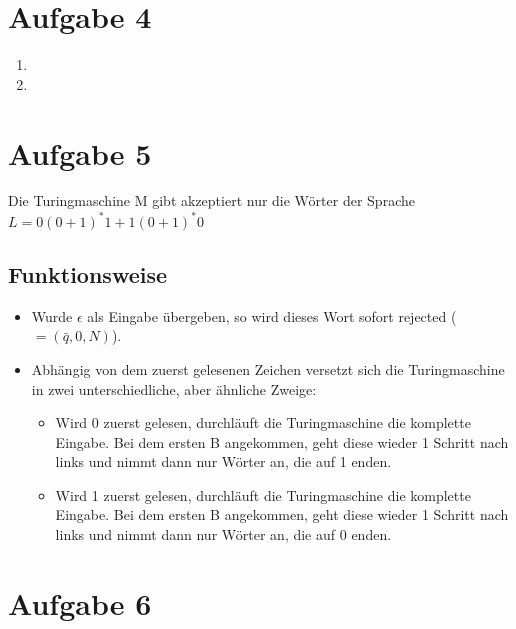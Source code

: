 \documentclass[a4paper,11pt]{scrartcl}
\begin{document}
	
	\section*{Aufgabe 4}
	\begin{enumerate}[label=\alph*)]
		\item 
		\item 
	\end{enumerate}
	
	
	\section*{Aufgabe 5}
	Die Turingmaschine M gibt akzeptiert nur die Wörter der Sprache $L = 0(0+1)^* 1 + 1(0+1)^* 0$
	\subsection*{Funktionsweise}
	\begin{itemize}
	\item Wurde $\epsilon$ als Eingabe übergeben, so wird dieses Wort sofort rejected ($=(\bar{q},0,N)$).
	\item Abhängig von dem zuerst gelesenen Zeichen versetzt sich die Turingmaschine in zwei unterschiedliche, aber ähnliche Zweige:
		\begin{itemize}
		\item Wird 0 zuerst gelesen, durchläuft die Turingmaschine die komplette Eingabe. Bei dem ersten B angekommen, geht diese wieder 1 Schritt nach links und nimmt dann nur Wörter an, die auf 1 enden.
		\item Wird 1 zuerst gelesen, durchläuft die Turingmaschine die komplette Eingabe. Bei dem ersten B angekommen, geht diese wieder 1 Schritt nach links und nimmt dann nur Wörter an, die auf 0 enden.
		\end{itemize}
	\end{itemize}
	
	\section*{Aufgabe 6}
	
		
		
\end{document}
